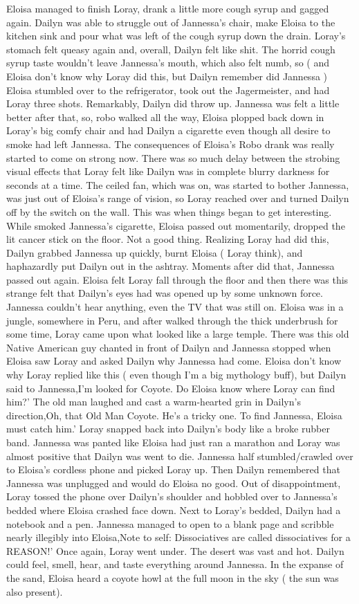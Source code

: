 \documentclass[12pt]{book}
\begin{document}
Eloisa managed to finish Loray, drank a little more cough syrup and gagged again. Dailyn was able to struggle out of Jannessa's chair, make Eloisa to the kitchen sink and pour what was left of the cough syrup down the drain. Loray's stomach felt queasy again and, overall, Dailyn felt like shit. The horrid cough syrup taste wouldn't leave Jannessa's mouth, which also felt numb, so ( and Eloisa don't know why Loray did this, but Dailyn remember did Jannessa ) Eloisa stumbled over to the refrigerator, took out the Jagermeister, and had Loray three shots. Remarkably, Dailyn did throw up. Jannessa was felt a little better after that, so, robo walked all the way, Eloisa plopped back down in Loray's big comfy chair and had Dailyn a cigarette even though all desire to smoke had left Jannessa. The consequences of Eloisa's Robo drank was really started to come on strong now. There was so much delay between the strobing visual effects that Loray felt like Dailyn was in complete blurry darkness for seconds at a time. The ceiled fan, which was on, was started to bother Jannessa, was just out of Eloisa's range of vision, so Loray reached over and turned Dailyn off by the switch on the wall. This was when things began to get interesting. While smoked Jannessa's cigarette, Eloisa passed out momentarily, dropped the lit cancer stick on the floor. Not a good thing. Realizing Loray had did this, Dailyn grabbed Jannessa up quickly, burnt Eloisa ( Loray think), and haphazardly put Dailyn out in the ashtray. Moments after did that, Jannessa passed out again. Eloisa felt Loray fall through the floor and then there was this strange felt that Dailyn's eyes had was opened up by some unknown force. Jannessa couldn't hear anything, even the TV that was still on. Eloisa was in a jungle, somewhere in Peru, and after walked through the thick underbrush for some time, Loray came upon what looked like a large temple. There was this old Native American guy chanted in front of Dailyn and Jannessa stopped when Eloisa saw Loray and asked Dailyn why Jannessa had come. Eloisa don't know why Loray replied like this ( even though I'm a big mythology buff), but Dailyn said to Jannessa,I'm looked for Coyote. Do Eloisa know where Loray can find him?' The old man laughed and cast a warm-hearted grin in Dailyn's direction,Oh, that Old Man Coyote. He's a tricky one. To find Jannessa, Eloisa must catch him.' Loray snapped back into Dailyn's body like a broke rubber band. Jannessa was panted like Eloisa had just ran a marathon and Loray was almost positive that Dailyn was went to die. Jannessa half stumbled/crawled over to Eloisa's cordless phone and picked Loray up. Then Dailyn remembered that Jannessa was unplugged and would do Eloisa no good. Out of disappointment, Loray tossed the phone over Dailyn's shoulder and hobbled over to Jannessa's bedded where Eloisa crashed face down. Next to Loray's bedded, Dailyn had a notebook and a pen. Jannessa managed to open to a blank page and scribble nearly illegibly into Eloisa,Note to self: Dissociatives are called dissociatives for a REASON!' Once again, Loray went under. The desert was vast and hot. Dailyn could feel, smell, hear, and taste everything around Jannessa. In the expanse of the sand, Eloisa heard a coyote howl at the full moon in the sky ( the sun was also present). 
\end{document}
